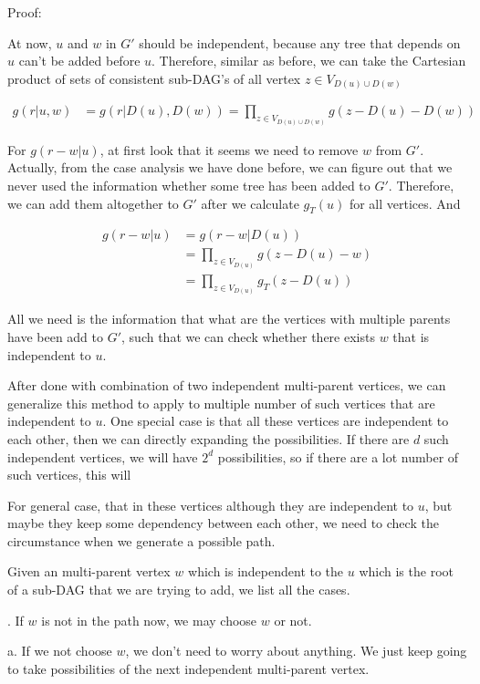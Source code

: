 \documentclass[11pt]{article}
\begin{document}
	\bigskip
	Proof:
	
	At now, $u$ and $w$ in $G'$ should be independent, because any tree that depends on $u$ can't be added before $u$. Therefore, similar as before, we can take the Cartesian product of sets of consistent sub-DAG's of all vertex $z \in V_{D(u) \cup D(w)}$
	
	\begin{align}
		g(r|u,w) &= g(r|D(u),D(w)) = \prod_{z \in V_{D(u) \cup D(w)}}g(z-D(u)-D(w))
	\end{align}
	
	For $g(r-w|u)$, at first look that it seems we need to remove $w$ from $G'$. Actually, from the case analysis we have done before, we can figure out that we never used the information whether some tree has been added to $G'$. Therefore, we can add them altogether to $G'$ after we calculate $g_T(u)$ for all vertices. And 
	
	\begin{align*}
		g(r-w|u) &= g(r-w|D(u))\\
			&= \prod_{z \in V_{D(u)}}g(z-D(u)-w)\\
			&= \prod_{z \in V_{D(u)}}g_T(z-D(u))
	\end{align*}
	
	All we need is the information that what are the vertices with multiple parents have been add to $G'$, such that we can check whether there exists $w$ that is independent to $u$.
	
	
	\bigskip
	After done with combination of two independent multi-parent vertices, we can generalize this method to apply to multiple number of such vertices that are independent to $u$. One special case is that all these vertices are independent to each other, then we can directly expanding the possibilities. If there are $d$ such independent vertices, we will have $2^d$ possibilities, so if there are a lot number of such vertices, this will 
	
	\bigskip
	For general case, that in these vertices although they are independent to $u$, but maybe they keep some dependency between each other, we need to check the circumstance when we generate a possible path.
	
	\bigskip
	Given an multi-parent vertex $w$ which is independent to the $u$ which is the root of a sub-DAG that we are trying to add, we list all the cases.
	
	. If $w$ is not in the path now, we may choose $w$ or not.
	
	\qquad a. If we not choose $w$, we don't need to worry about anything. We just keep going to take possibilities of the next independent multi-parent vertex.
	
\end{document}
